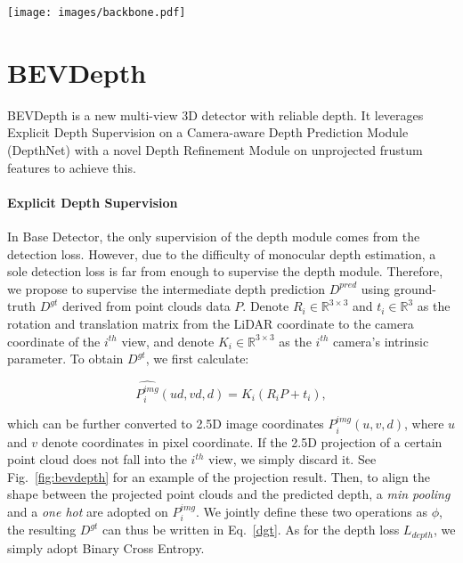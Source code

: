 \documentclass[twocolumn,letterpaper]{article}
\begin{document}
\begin{figure*}[t]
\texttt{[image: images/backbone.pdf]}
\centering
\caption{Framework of BEVDepth. Image backbone extracts image feature from multi-view images. Depth net takes Image feature as input, generates context and depth, and gets the final point feature. Voxel Pooling unifies all point features into one coordinate system and pools them onto the BEV feature map.}
\label{fig:bevdepth}
\end{figure*}



\section{BEVDepth}\label{sec4}

BEVDepth is a new multi-view 3D detector with reliable depth. It leverages Explicit Depth Supervision on a Camera-aware Depth Prediction Module (DepthNet) with a novel Depth Refinement Module on unprojected frustum features to achieve this.

\paragraph{Explicit Depth Supervision} In Base Detector, the only supervision of the depth module comes from the detection loss. However, due to the difficulty of monocular depth estimation, a sole detection loss is far from enough to supervise the depth module. Therefore, we propose to supervise the intermediate depth prediction $D^{pred}$ using ground-truth $D^{gt}$ derived from point clouds data $P$. Denote $R_i \in \mathbb{R}^{3\times3}$ and $t_i \in \mathbb{R}^3$ as the rotation and translation matrix from the LiDAR coordinate to the camera coordinate of the $i^{th}$ view, and denote $K_i\in \mathbb{R}^{3\times3}$ as the $i^{th}$ camera's intrinsic parameter. To obtain $D^{gt}$, we first calculate:

\begin{equation}
    \hat{P_i^{img}}(ud, vd, d) = K_{i}(R_i P + t_i),
\end{equation}

\noindent which can be further converted to 2.5D image coordinates $P_i^{img}(u, v, d)$, where $u$ and $v$ denote coordinates in pixel coordinate. If the 2.5D projection of a certain point cloud does not fall into the $i^{th}$ view, we simply discard it. See Fig.~\ref{fig:bevdepth} for an example of the projection result. Then, to align the shape between the projected point clouds and the predicted depth, a \textit{min pooling} and a \textit{one hot} are adopted on $P_i^{img}$. We jointly define these two operations as $\phi$, the resulting $D^{gt}$ can thus be written in Eq.~\ref{dgt}. As for the depth loss $L_{depth}$, we simply adopt Binary Cross Entropy. 
\end{document}
